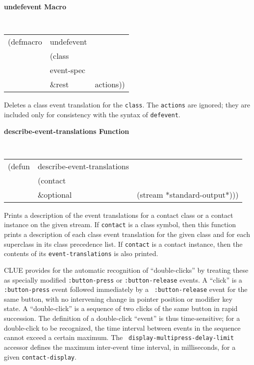 {\large {\bf undefevent \hfill Macro}} 
\begin{flushright} \parbox[t]{6.125in}{
\tt
\begin{tabular}{lll}
\raggedright
(defmacro & undefevent \\ 
& (class\\
&  event-spec\\
& \&rest & actions))
\end{tabular}
\rm

}\end{flushright}

\begin{flushright} \parbox[t]{6.125in}{
Deletes a class event translation for the {\tt class}.
The {\tt actions} are ignored; they are included only for consistency with the
syntax  of {\tt defevent}. }\end{flushright}

{\samepage
{\large {\bf describe-event-translations \hfill Function}} 
\begin{flushright} \parbox[t]{6.125in}{
\tt
\begin{tabular}{lll}
\raggedright
(defun & describe-event-translations \\ 
& (contact\\
&  \&optional & (stream *standard-output*)))
\end{tabular}
\rm

}\end{flushright}}


\begin{flushright} \parbox[t]{6.125in}{
Prints a description of the event translations for a contact class or a contact
instance on the given stream. If {\tt contact} is a class symbol, then this
function prints a description of each class event translation for the given class
and for each superclass in its class precedence list. If {\tt contact} is a
contact instance, then the contents of its {\tt event-translations} is also
printed.

}\end{flushright}


CLUE provides for the automatic
recognition of ``double-clicks'' by treating these as specially
modified {\tt :button-press} or {\tt :button-release} events.  A
``click'' is a {\tt :button-press} event followed immediately by a {\tt
:button-release} event for the same button, with no intervening change
in pointer position\footnotemark{} or modifier
key state.  A ``double-click''
is a sequence of two clicks of the same button in rapid succession.  The
definition of a double-click ``event'' is thus time-sensitive; for a
double-click to be recognized, the time interval between events in the
sequence cannot exceed a certain maximum.  The {\tt
display-multipress-delay-limit} accessor defines the maximum
inter-event time
interval, in milliseconds,
for a given {\tt contact-display}.

